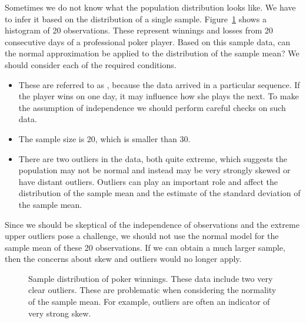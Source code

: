 \begin{examplewrap}
\begin{nexample}{Sometimes we do not know what the population distribution looks like. We have to infer it based on the distribution of a single sample. Figure~\ref{pokerProfitsCanApplyNormalToSampMean} shows a histogram of 20 observations. These represent winnings and losses from 20 consecutive days of a professional poker player. Based on this sample data, can the normal approximation be applied to the distribution of the sample mean?}
We should consider each of the required conditions.
\begin{itemize}
\setlength{\itemsep}{0mm}
\item[(1)] These are referred to as , because the data arrived in a particular sequence. If the player wins on one day, it may influence how she plays the next. To make the assumption of independence we should perform careful checks on such data.
\item[(2)] The sample size is 20, which is smaller than 30.
\item[(3)] There are two outliers in the data, both quite extreme, which suggests the population may not be normal and instead may be very strongly skewed or have distant outliers. Outliers can play an important role and affect the distribution of the sample mean and the estimate of the standard deviation of the sample mean.
\end{itemize}
Since we should be skeptical of the independence of observations and the extreme upper outliers pose a challenge, we should not use the normal model for the sample mean of these 20 observations. If we can obtain a much larger sample, then the concerns about skew and outliers would no longer apply.
\end{nexample}
\end{examplewrap}

\begin{figure}[ht]
   \centering
{}
   \caption{Sample distribution of poker winnings. These data include two very clear outliers. These are problematic when considering the normality of the sample mean. For example, outliers are often an indicator of very strong skew.}
   \label{pokerProfitsCanApplyNormalToSampMean}
\end{figure}

